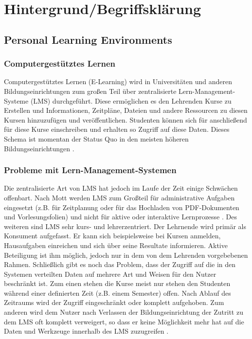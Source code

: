 \chapter{Hintergrund/Begriffsklärung} 
\label{Kapitel 2}
\section{Personal Learning Environments}
\subsection{Computergestütztes Lernen}\label{section:e-learning}
Computergestütztes Lernen (E-Learning) wird in Universitäten und anderen Bildungseinrichtungen zum großen Teil über zentralisierte Lern-Management-Systeme (LMS) durchgeführt. Diese ermöglichen es den Lehrenden Kurse zu Erstellen und Informationen, Zeitpläne, Dateien und andere Ressourcen zu diesen Kursen hinzuzufügen und veröffentlichen. Studenten können sich für anschließend für diese Kurse einschreiben und erhalten so Zugriff auf diese Daten. Dieses Schema ist momentan der Status Quo in den meisten höheren Bildungseinrichtungen \cite{Mott2010}. 

\subsection{Probleme mit Lern-Management-Systemen}
Die zentralisierte Art von LMS hat jedoch im Laufe der Zeit einige Schwächen offenbart. Nach Mott werden LMS zum Großteil für administrative Aufgaben eingesetzt (z.B. für Zeitplanung oder für das Hochladen von PDF-Dokumenten und Vorlesungsfolien) und nicht für aktive oder interaktive Lernprozesse \cite{Mott2010}. Des weiteren sind LMS sehr kurs- und lehrerzentriert. Der Lehrnende wird primär als Konsument aufgefasst. Er kann sich beispielsweise bei Kursen anmelden, Hausaufgaben einreichen und sich über seine Resultate informieren. Aktive Beteiligung ist ihm möglich, jedoch nur in dem von dem Lehrenden vorgebebenen Rahmen.
Schließlich gibt es noch das Problem, dass der Zugriff auf die in den Systemen verteilten Daten auf mehrere Art und Weisen für den Nutzer beschränkt ist. Zum einen stehen die Kurse meist nur stehen den Studenten während einer definierten Zeit (z.B. einem Semester) offen. Nach Ablauf des Zeitraums wird der Zugriff eingeschränkt oder komplett aufgehoben. Zum anderen wird dem Nutzer nach Verlassen der Bildungseinrichtung der Zutritt zu dem LMS oft komplett verweigert, so dass er keine Möglichkeit mehr hat auf die Daten und Werkzeuge innerhalb des LMS zuzugreifen \cite{Schaffert2008a}.

